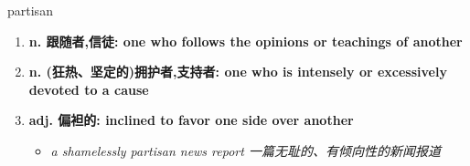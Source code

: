 
\begin{frame}
{\huge partisan}
\begin{center}
\begin{enumerate}\Large
  \item \textbf{n. 跟随者,信徒: one who follows the opinions or teachings of another}
  \item \textbf{n. (狂热、坚定的)拥护者,支持者: one who is intensely or excessively devoted to a cause}
  \item \textbf{adj. 偏袒的: inclined to favor one side over another}
  \begin{itemize}
    \item \em{\Large{a shamelessly partisan news report 一篇无耻的、有倾向性的新闻报道}}
  \end{itemize}
\end{enumerate}
\end{center}
\end{frame}
